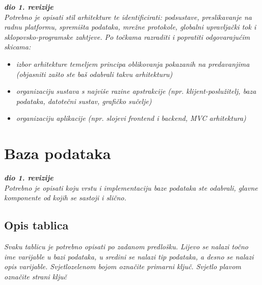 		
		\textbf{\textit{dio 1. revizije}}\\

		\textit{ Potrebno je opisati stil arhitekture te identificirati: podsustave, preslikavanje na radnu platformu, spremišta podataka, mrežne protokole, globalni upravljački tok i sklopovsko-programske zahtjeve. Po točkama razraditi i popratiti odgovarajućim skicama:}
	\begin{itemize}
		\item 	\textit{izbor arhitekture temeljem principa oblikovanja pokazanih na predavanjima (objasniti zašto ste baš odabrali takvu arhitekturu)}
		\item 	\textit{organizaciju sustava s najviše razine apstrakcije (npr. klijent-poslužitelj, baza podataka, datotečni sustav, grafičko sučelje)}
		\item 	\textit{organizaciju aplikacije (npr. slojevi frontend i backend, MVC arhitektura) }		
	\end{itemize}

	
		

		

				
		\section{Baza podataka}
			
			\textbf{\textit{dio 1. revizije}}\\
			
		\textit{Potrebno je opisati koju vrstu i implementaciju baze podataka ste odabrali, glavne komponente od kojih se sastoji i slično.}
		
			\subsection{Opis tablica}
			

				\textit{Svaku tablicu je potrebno opisati po zadanom predlošku. Lijevo se nalazi točno ime varijable u bazi podataka, u sredini se nalazi tip podataka, a desno se nalazi opis varijable. Svjetlozelenom bojom označite primarni ključ. Svjetlo plavom označite strani ključ}
				
